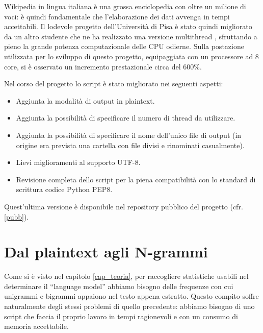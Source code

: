Wikipedia in lingua italiana è una grossa enciclopedia con oltre un milione di voci: è quindi fondamentale che l'elaborazione dei dati avvenga in tempi accettabili. Il lodevole progetto dell'Università di Pisa è stato quindi migliorato da un altro studente che ne ha realizzato una versione multithread \cite{WikiExtractorMTUniPi}, sfruttando a pieno la grande potenza computazionale delle CPU odierne. Sulla postazione utilizzata per lo sviluppo di questo progetto, equipaggiata con un processore ad 8 core, si è osservato un incremento prestazionale circa del 600\%.

Nel corso del progetto lo script è stato migliorato nei seguenti aspetti:
\begin{itemize}
	\item Aggiunta la modalità di output in plaintext.
	\item Aggiunta la possibilità di specificare il numero di thread da utilizzare.
	\item Aggiunta la possibilità di specificare il nome dell'unico file di output (in origine era prevista una cartella con file divisi e rinominati casualmente).
	\item Lievi miglioramenti al supporto UTF-8.
	\item Revisione completa dello script per la piena compatibilità con lo standard di scrittura codice Python PEP8.
\end{itemize}

Quest'ultima versione è disponibile nel repository pubblico del progetto (cfr. \ref{pubb}).
\section{Dal plaintext agli N-grammi}
Come si è visto nel capitolo \ref{cap_teoria}, per raccogliere statistiche usabili nel determinare il ``language model'' abbiamo bisogno delle frequenze con cui unigrammi e bigrammi appaiono nel testo appena estratto. Questo compito soffre naturalmente degli stessi problemi di quello precedente: abbiamo bisogno di uno script che faccia il proprio lavoro in tempi ragionevoli e con un consumo di memoria accettabile.

